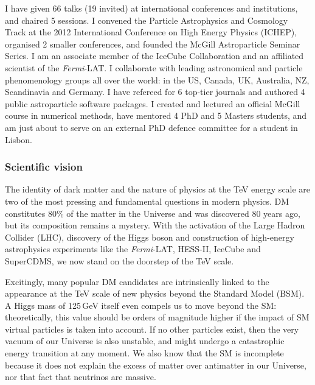 \documentclass[11pt,oneside,twocolumn,a4paper]{article}
\begin{document}
I have given 66 talks (19 invited) at international conferences and institutions, and chaired 5 sessions. I convened the Particle Astrophysics and Cosmology Track at the 2012 International Conference on High Energy Physics (ICHEP), organised 2 smaller conferences, and founded the McGill Astroparticle Seminar Series. I am an associate member of the IceCube Collaboration and an affiliated scientist of the \emph{Fermi}-LAT. I collaborate with leading astronomical and particle phenomenology groups all over the world: in the US, Canada, UK, Australia, NZ, Scandinavia and Germany.  I have refereed for 6 top-tier journals and authored 4 public astroparticle software packages. I created and lectured an official McGill course in numerical methods, have mentored 4 PhD and 5 Masters students, and am just about to serve on an external PhD defence committee for a student in Lisbon.

\subsubsection*{Scientific vision}

The identity of dark matter and the nature of physics at the TeV energy scale are two of the most pressing and fundamental questions in modern physics.  DM constitutes 80\% of the matter in the Universe and was discovered 80 years ago, but its composition remains a mystery.  With the activation of the Large Hadron Collider (LHC), discovery of the Higgs boson and construction of high-energy astrophysics experiments like the \emph{Fermi}-LAT, HESS-II, IceCube and SuperCDMS, we now stand on the doorstep of the TeV scale.  

Excitingly, many popular DM candidates are intrinsically linked to the appearance at the TeV scale of new physics beyond the Standard Model (BSM).  A Higgs mass of 125\,GeV itself even compels us to move beyond the SM: theoretically, this value should be orders of magnitude higher if the impact of SM virtual particles is taken into account.  If no other particles exist, then the very vacuum of our Universe is also unstable, and might undergo a catastrophic energy transition at any moment.  We also know that the SM is incomplete because it does not explain the excess of matter over antimatter in our Universe, nor that fact that neutrinos are massive.
\end{document}
